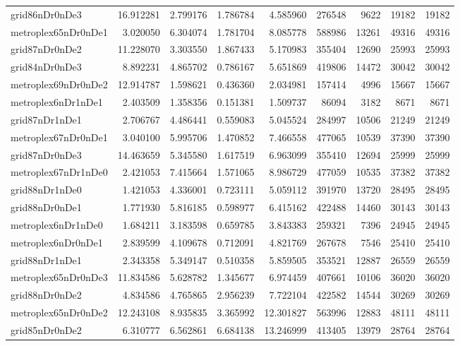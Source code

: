 \begin{longtable}{|l|r|r|r|r|r|r|r|r|}
grid86nDr0nDe3 & 16.912281 & 2.799176 & 1.786784 & 4.585960 & 276548 & 9622 & 19182 & 19182 \\
metroplex65nDr0nDe1 & 3.020050 & 6.304074 & 1.781704 & 8.085778 & 588986 & 13261 & 49316 & 49316 \\
grid87nDr0nDe2 & 11.228070 & 3.303550 & 1.867433 & 5.170983 & 355404 & 12690 & 25993 & 25993 \\
grid84nDr0nDe3 & 8.892231 & 4.865702 & 0.786167 & 5.651869 & 419806 & 14472 & 30042 & 30042 \\
metroplex69nDr0nDe2 & 12.914787 & 1.598621 & 0.436360 & 2.034981 & 157414 & 4996 & 15667 & 15667 \\
metroplex6nDr1nDe1 & 2.403509 & 1.358356 & 0.151381 & 1.509737 & 86094 & 3182 & 8671 & 8671 \\
grid87nDr1nDe1 & 2.706767 & 4.486441 & 0.559083 & 5.045524 & 284997 & 10506 & 21249 & 21249 \\
metroplex67nDr0nDe1 & 3.040100 & 5.995706 & 1.470852 & 7.466558 & 477065 & 10539 & 37390 & 37390 \\
grid87nDr0nDe3 & 14.463659 & 5.345580 & 1.617519 & 6.963099 & 355410 & 12694 & 25999 & 25999 \\
metroplex67nDr1nDe0 & 2.421053 & 7.415664 & 1.571065 & 8.986729 & 477059 & 10535 & 37382 & 37382 \\
grid88nDr1nDe0 & 1.421053 & 4.336001 & 0.723111 & 5.059112 & 391970 & 13720 & 28495 & 28495 \\
grid88nDr0nDe1 & 1.771930 & 5.816185 & 0.598977 & 6.415162 & 422488 & 14460 & 30143 & 30143 \\
metroplex6nDr1nDe0 & 1.684211 & 3.183598 & 0.659785 & 3.843383 & 259321 & 7396 & 24945 & 24945 \\
metroplex6nDr0nDe1 & 2.839599 & 4.109678 & 0.712091 & 4.821769 & 267678 & 7546 & 25410 & 25410 \\
grid88nDr1nDe1 & 2.343358 & 5.349147 & 0.510358 & 5.859505 & 353521 & 12887 & 26559 & 26559 \\
metroplex65nDr0nDe3 & 11.834586 & 5.628782 & 1.345677 & 6.974459 & 407661 & 10106 & 36020 & 36020 \\
grid88nDr0nDe2 & 4.834586 & 4.765865 & 2.956239 & 7.722104 & 422582 & 14544 & 30269 & 30269 \\
metroplex65nDr0nDe2 & 12.243108 & 8.935835 & 3.365992 & 12.301827 & 563996 & 12883 & 48111 & 48111 \\
grid85nDr0nDe2 & 6.310777 & 6.562861 & 6.684138 & 13.246999 & 413405 & 13979 & 28764 & 28764 \\

\end{longtable}
